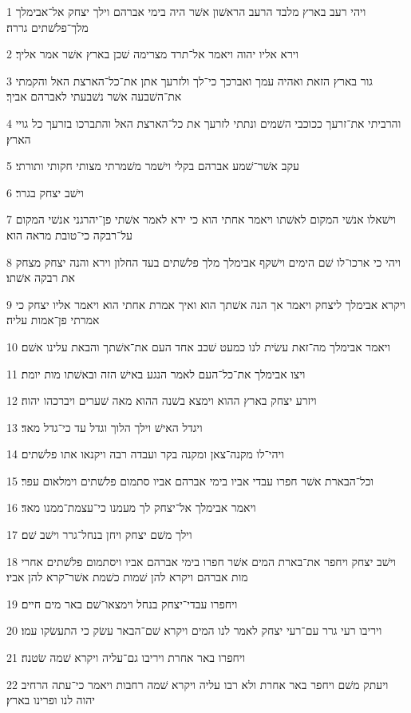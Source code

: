 \par 1 ויהי רעב בארץ מלבד הרעב הראשׁון אשׁר היה בימי אברהם וילך יצחק אל־אבימלך מלך־פלשׁתים גררה׃
\par 2 וירא אליו יהוה ויאמר אל־תרד מצרימה שׁכן בארץ אשׁר אמר אליך׃
\par 3 גור בארץ הזאת ואהיה עמך ואברכך כי־לך ולזרעך אתן את־כל־הארצת האל והקמתי את־השׁבעה אשׁר נשׁבעתי לאברהם אביך׃
\par 4 והרביתי את־זרעך ככוכבי השׁמים ונתתי לזרעך את כל־הארצת האל והתברכו בזרעך כל גויי הארץ׃
\par 5 עקב אשׁר־שׁמע אברהם בקלי וישׁמר משׁמרתי מצותי חקותי ותורתי׃
\par 6 וישׁב יצחק בגרר׃
\par 7 וישׁאלו אנשׁי המקום לאשׁתו ויאמר אחתי הוא כי ירא לאמר אשׁתי פן־יהרגני אנשׁי המקום על־רבקה כי־טובת מראה הוא׃
\par 8 ויהי כי ארכו־לו שׁם הימים וישׁקף אבימלך מלך פלשׁתים בעד החלון וירא והנה יצחק מצחק את רבקה אשׁתו׃
\par 9 ויקרא אבימלך ליצחק ויאמר אך הנה אשׁתך הוא ואיך אמרת אחתי הוא ויאמר אליו יצחק כי אמרתי פן־אמות עליה׃
\par 10 ויאמר אבימלך מה־זאת עשׂית לנו כמעט שׁכב אחד העם את־אשׁתך והבאת עלינו אשׁם׃
\par 11 ויצו אבימלך את־כל־העם לאמר הנגע באישׁ הזה ובאשׁתו מות יומת׃
\par 12 ויזרע יצחק בארץ ההוא וימצא בשׁנה ההוא מאה שׁערים ויברכהו יהוה׃
\par 13 ויגדל האישׁ וילך הלוך וגדל עד כי־גדל מאד׃
\par 14 ויהי־לו מקנה־צאן ומקנה בקר ועבדה רבה ויקנאו אתו פלשׁתים׃
\par 15 וכל־הבארת אשׁר חפרו עבדי אביו בימי אברהם אביו סתמום פלשׁתים וימלאום עפר׃
\par 16 ויאמר אבימלך אל־יצחק לך מעמנו כי־עצמת־ממנו מאד׃
\par 17 וילך משׁם יצחק ויחן בנחל־גרר וישׁב שׁם׃
\par 18 וישׁב יצחק ויחפר את־בארת המים אשׁר חפרו בימי אברהם אביו ויסתמום פלשׁתים אחרי מות אברהם ויקרא להן שׁמות כשׁמת אשׁר־קרא להן אביו׃
\par 19 ויחפרו עבדי־יצחק בנחל וימצאו־שׁם באר מים חיים׃
\par 20 ויריבו רעי גרר עם־רעי יצחק לאמר לנו המים ויקרא שׁם־הבאר עשׂק כי התעשׂקו עמו׃
\par 21 ויחפרו באר אחרת ויריבו גם־עליה ויקרא שׁמה שׂטנה׃
\par 22 ויעתק משׁם ויחפר באר אחרת ולא רבו עליה ויקרא שׁמה רחבות ויאמר כי־עתה הרחיב יהוה לנו ופרינו בארץ׃
